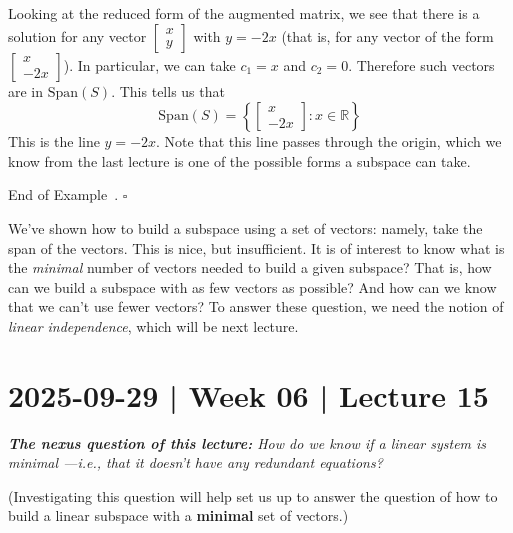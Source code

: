 \documentclass[10pt]{article}
\theoremstyle{definition}
\newtheorem{example}[theorem]{Example}
\renewenvironment{example}
{\begin{oldexample}}
  {\par\smallskip\hfill   End of Example~\theexample. $\square$    \par\end{oldexample}}
\newcommand{\R}{\mathbb{R}}           %
\newcommand{\Span}{\mathrm{Span}} %
\begin{document}
\begin{example}
Looking at the reduced form of the augmented matrix, we see that there is a
solution for any vector $ \begin{bmatrix} x\\y \end{bmatrix} $ with $y=-2x$
(that is, for any vector of the form $\begin{bmatrix} x\\-2x \end{bmatrix}$).
In particular, we can take $c_{1}=x$ and $c_{2}=0$. Therefore such vectors are
in $\Span(S)$. This tells us that
\begin{equation*}
  \Span(S)= \left\{
    \begin{bmatrix}
      x\\-2x
    \end{bmatrix}
    :
    x\in \R
  \right\}
\end{equation*}
This is the line $y=-2x$. Note that this line passes through the origin, which
we know from the last lecture is one of the possible forms a subspace can take.
\end{example}


We've shown how to build a subspace using a set of vectors: namely, take the
span of the vectors. This is nice, but insufficient. It is of interest to know
what is the \textit{minimal} number of vectors needed to build a given
subspace? That is, how can we build a subspace with as few vectors as
possible? And how can we know that we can't use fewer vectors? To answer these
question, we need the notion of \textit{linear independence}, which will be
next lecture.

\newpage
\section{2025-09-29 | Week 06 | Lecture 15}

\begin{center}
  \begin{tcolorbox}[width=0.9\textwidth, colback=white, colframe=black]
    \textit{\textbf{The nexus question of this lecture:} How do we know if a
      linear system is minimal ---i.e., that it doesn't have any redundant equations?}
  \end{tcolorbox}
\end{center}

(Investigating this question will help set us up to answer the question of how
to build a linear subspace with a \textbf{minimal} set of vectors.)
\end{document}
